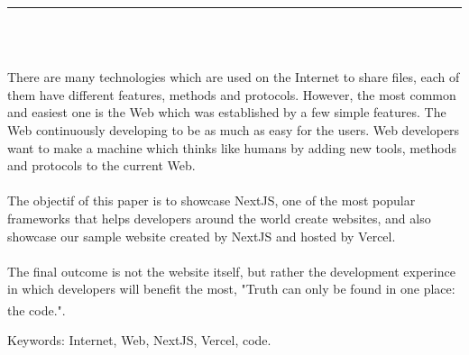 \documentclass[12pt]{report}
\newenvironment{changemargin}[2]{%
\begin{list}{}{%
\setlength{\topsep}{0pt}%
\setlength{\leftmargin}{#1}%
\setlength{\rightmargin}{#2}%
\setlength{\listparindent}{\parindent}%
\setlength{\itemindent}{\parindent}%
\setlength{\parsep}{\parskip}%
}%
\item[]}{\end{list}}
\begin{document}
\begin{center}
    {\color{Blue} \rule{3in}{1.4mm} }\\
    \vspace{0.1in}
    \scshape{\fontsize{34}{46}{\bfseries{\color{Blue}{Abstract}}}}
    \\
    \vspace{0.6in}
\end{center}
\begin{changemargin}{0.9cm}{0.9cm}
There are many technologies which are used on the Internet to share files, each of them have different features, methods and protocols. However, the most common and easiest one is the Web which was established by a few simple features. The Web continuously developing to be as much as easy for the users. Web developers want to make a machine which thinks like humans by adding new tools, methods and protocols to the current Web.
\\\\
The objectif of this paper is to showcase NextJS, one of the most popular frameworks that helps developers around the world create websites, and also showcase our sample website created by NextJS and hosted by Vercel.
\\\\
    The final outcome is not the website itself, but rather the development experince in which developers will benefit the most, "Truth can only be found in one place: the code.". \textsuperscript{\cite{martin2018clean}}
\end{changemargin}

\vspace{1in}

\begin{changemargin}{0.9cm}{0.9cm}
Keywords: Internet, Web, NextJS, Vercel, code.
\end{changemargin}

\newpage

\tableofcontents

\newpage

\listoffigures

\newpage

\listoftables
\end{document}
